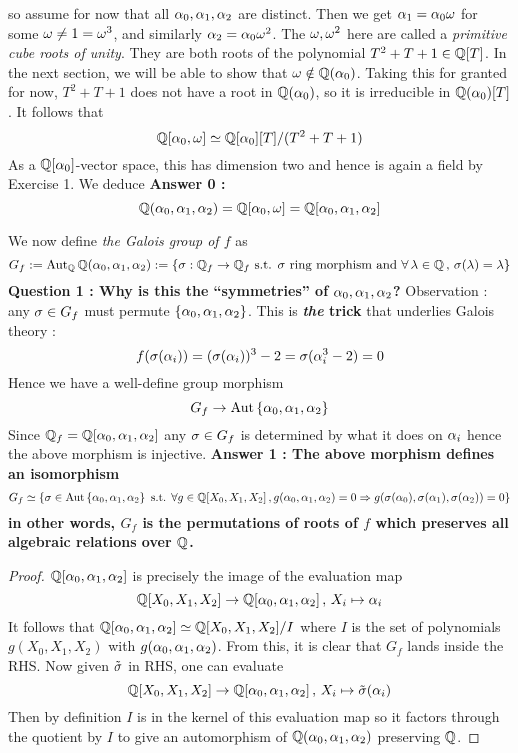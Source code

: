 \documentclass{article}
\begin{document}
so assume for now that all $\alpha_0 , \alpha_1 , \alpha_2$ are distinct.
Then we get $\alpha_1 = \alpha_0 \omega$ for some $\omega \neq 1 = \omega^3$,
and similarly $\alpha_2 = \alpha_0 \omega^2$.
The $\omega, \omega^2$ here are called a \emph{primitive cube roots of unity}.
They are both roots of the polynomial $T^2 + T + 1 \in \mathbb{Q}[T]$.
In the next section, we will be able to show that $\omega \notin \mathbb{Q}(\alpha_0)$.
Taking this for granted for now,
$T^2 + T + 1$ does not have a root in $\mathbb{Q}(\alpha_0)$,
so it is irreducible in $\mathbb{Q}(\alpha_0)[T]$.
It follows that \[
  \mathbb{Q}[\alpha_0 , \omega] \simeq \mathbb{Q}[\alpha_0][T] / (T^2 + T + 1)
\]
As a $\mathbb{Q}[\alpha_0]$-vector space, this has dimension two and
hence is again a field by Exercise 1. 
We deduce 
\textbf{Answer 0 :} \[
  \mathbb{Q}(\alpha_0 , \alpha_1 , \alpha_2) = \mathbb{Q}[\alpha_0 , \omega] = \mathbb{Q}[\alpha_0 , \alpha_1 ,\alpha_2]
\]

We now define \emph{the Galois group of $f$} as \[
  G_f := \operatorname{Aut}_{\mathbb{Q}} \mathbb{Q}(\alpha_0 , \alpha_1 , \alpha_2)
  := \left\{\sigma : \mathbb{Q}_f \to \mathbb{Q}_f \text{ s.t. } \sigma \text{ ring morphism and }
  \forall\,\lambda \in \mathbb{Q}\,,\,\sigma(\lambda) = \lambda\right\}
\]
\textbf{Question 1 : Why is this the ``symmetries'' of $\alpha_0 , \alpha_1 ,\alpha_2$?}
Observation : any $\sigma \in G_f$ must permute $\left\{\alpha_0 , \alpha_1 , \alpha_2\right\}$.
This is \textbf{\emph{the} trick} that underlies Galois theory : \[
  f(\sigma(\alpha_i)) = (\sigma(\alpha_i))^3 - 2 = \sigma(\alpha_i^3 - 2) = 0
\]
Hence we have a well-define group morphism \[
  G_f \to \operatorname{Aut}\left\{\alpha_0 , \alpha_1 , \alpha_2\right\}
\]
Since $\mathbb{Q}_f = \mathbb{Q}[\alpha_0 , \alpha_1 ,\alpha_2]$ any $\sigma \in G_f$
is determined by what it does on $\alpha_i$ hence the above morphism is injective.
\textbf{Answer 1 : The above morphism defines an isomorphism}
\[
  G_f \simeq \left\{
    \sigma \in \operatorname{Aut}\left\{\alpha_0 ,\alpha_1 ,\alpha_2\right\} \text{ s.t. } 
    \forall g \in \mathbb{Q}[X_0 , X_1 , X_2] \,,
    g(\alpha_0 , \alpha_1 ,\alpha_2) = 0 \Rightarrow
    g(\sigma(\alpha_0) , \sigma(\alpha_1) , \sigma(\alpha_2)) = 0
  \right\}
\]
\textbf{in other words, $G_f$ is the permutations of roots of $f$
which preserves all algebraic relations over $\mathbb{Q}$.}
\begin{proof}
  $\mathbb{Q}[\alpha_0 , \alpha_1 , \alpha_2]$ is precisely the image of 
  the evaluation map \[
    \mathbb{Q}[X_0 , X_1 , X_2] \to \mathbb{Q}[\alpha_0 , \alpha_1 , \alpha_2] \,,\,X_i \mapsto \alpha_i
  \]
  It follows that $
    \mathbb{Q}[\alpha_0 , \alpha_1 , \alpha_2] \simeq 
    \mathbb{Q}[X_0 , X_1 , X_2] / I
  $ where $I$ is the set of polynomials $g(X_0 , X_1 , X_2)$ with
  $g(\alpha_0 , \alpha_1 , \alpha_2)$.
  From this, it is clear that $G_f$ lands inside the RHS.
  Now given $\tilde{\sigma}$ in RHS,
  one can evaluate \[
    \mathbb{Q}[X_0 , X_1 , X_2] \to \mathbb{Q}[\alpha_0 , \alpha_1 ,\alpha_2] \,,\, 
    X_i \mapsto \tilde{\sigma}(\alpha_i)
  \]
  Then by definition $I$ is in the kernel of this evaluation map
  so it factors through the quotient by $I$ to give
  an automorphism of $\mathbb{Q}(\alpha_0 , \alpha_1 , \alpha_2)$ preserving $\mathbb{Q}$.
\end{proof}
\end{document}
